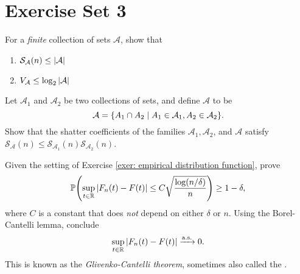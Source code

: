 \section{Exercise Set 3}

\begin{exercise}
For a \emph{finite} collection of sets $\mathcal{A}$, show that
\begin{enumerate}
    \item $\mathcal{S}_{\mathcal{A}}(n) \leq \abs{\mathcal{A}}$

    \item $V_{\mathcal{A}} \leq \log_2\abs{\mathcal{A}}$
\end{enumerate}
\end{exercise}


\begin{exercise}
Let $\mathcal{A}_1$ and $\mathcal{A}_2$ be two collections of sets, and define $\mathcal{A}$ to be
\[
    \mathcal{A} = \set{A_1 \cap A_2 \with A_1 \in \mathcal{A}_1, A_2 \in \mathcal{A}_2}.
\]
Show that the shatter coefficients of the families $\mathcal{A}_1, \mathcal{A}_2$, and $\mathcal{A}$ satisfy $\mathcal{S}_{\mathcal{A}}(n) \leq \mathcal{S}_{\mathcal{A}_1}(n) \mathcal{S}_{\mathcal{A}_2}(n)$.
\end{exercise}


\begin{exercise}
Given the setting of Exercise \ref{exer: empirical distribution function}, prove
\[
    \P\left(\sup_{t \in \R} \abs{F_n(t) - F(t)} \leq C \sqrt{\frac{\log(n / \delta)}{n}}\right) \geq 1 - \delta,
\]
where $C$ is a constant that does \emph{not} depend on either $\delta$ or $n$. Using the Borel-Cantelli lemma, conclude
\[
    \sup_{t \in \mathbb{R}} \abs{F_n(t) - F(t)} \xrightarrow{\mathrm{a.s.}} 0.
\]
This is known as the \emph{Glivenko-Cantelli theorem}, sometimes also called the .
\end{exercise}
